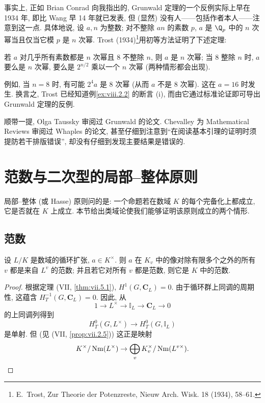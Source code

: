 事实上, 正如 Brian Conrad 向我指出的, Grunwald 定理的一个反例实际上早在 1934 年, 即比 Wang 早 14 年就已发表, 但 (显然) 没有人——包括作者本人——注意到这一点. 具体地说, 设 $a,n$ 为整数; 对不整除 $an$ 的素数 $p$, $a$ 是 $\Q_p$ 中的 $n$ 次幂当且仅当它模 $p$ 是 $n$ 次幂. Trost (1934)\footnote{E.~Trost, Zur Theorie der Potenzreste, Nieuw Arch. Wisk. 18 (1934), 58--61.}用初等方法证明了下述定理:

若 $a$ 对几乎所有素数都是 $n$ 次幂且 $8$ 不整除 $n$, 则 $a$ 是 $n$ 次幂; 当 $8$ 整除 $n$ 时, $a$ 要么是 $n$ 次幂, 要么是 $2^{n/2}$ 乘以一个 $n$ 次幂 (两种情形都会出现).

例如, 当 $n=8$ 时, 有可能 $2^{4}a$ 是 $8$ 次幂 (从而 $a$ 不是 $8$ 次幂). 这在 $a=16$ 时发生. 换言之, Trost 已经知道例\ref{ex:viii.2.2} 的断言 (i), 而由它通过标准论证即可导出 Grunwald 定理的反例.

顺带一提, Olga Taussky 审阅过 Grunwald 的论文. Chevalley 为 Mathematical Reviews 审阅过 Whaples 的论文, 甚至仔细到注意到``在阅读基本引理的证明时须提防若干排版错误'', 却没有仔细到发现主要结果是错误的.
\section{范数与二次型的局部--整体原则}\label{sec:VIII.3}

局部--整体 (或 Hasse) 原则问的是: 一个命题若在数域 $K$ 的每个完备化上都成立, 它是否就在 $K$ 上成立. 本节给出类域论使我们能够证明该原则成立的两个情形.

\subsection*{范数}

\begin{theorem}\label{thm:viii.3.1}
设 $L/K$ 是数域的循环扩张, $a\in K^{\times}$. 则 $a$ 在 $K_v$ 中的像对除有限多个之外的所有 $v$ 都是来自 $L^{v}$ 的范数; 并且若它对所有 $v$ 都是范数, 则它是 $K$ 中的范数.
\end{theorem}

\begin{proof}
根据定理 (VII, \ref{thm:vii.5.1}), $H^{1}(G,\mathbf{C}_{L})=0$. 由于循环群上同调的周期性, 这蕴含 $H_{T}^{-1}(G,\mathbf{C}_{L})=0$. 因此, 从
\[
1\to L^{\times}\to\mathbb{I}_{L}\to\mathbf{C}_{L}\to0
\]
的上同调列得到
\[
H_{T}^{0}(G,L^{\times})\to H_{T}^{0}(G,\mathbb{I}_{L})
\]
是单射. 但 (见 (VII, \ref{prop:vii.2.5})) 这正是映射
\[
K^{\times}/\operatorname{Nm}(L^{\times})\to\bigoplus_{v}K_{v}^{\times}/\operatorname{Nm}(L^{v\times}).
\]
\end{proof}

